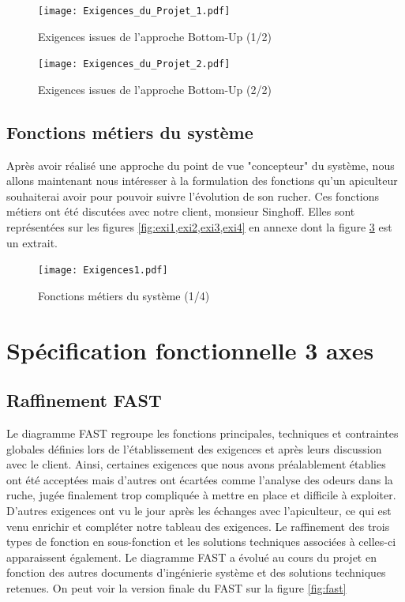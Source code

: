  
\begin{figure}[h!]
\centering\texttt{[image: Exigences\_du\_Projet\_1.pdf]}
\caption{\label{fig:exi1} Exigences issues de l'approche Bottom-Up (1/2)}
\end{figure}

 
\begin{figure}[h!]
\centering\texttt{[image: Exigences\_du\_Projet\_2.pdf]}
\caption{\label{fig:exi2} Exigences issues de l'approche Bottom-Up (2/2)}
\end{figure}

\clearpage

\section{Fonctions métiers du système}
\vspace{1.5cm}

Après avoir réalisé une approche du point de vue "concepteur" du système, nous allons maintenant nous intéresser à la formulation des fonctions qu'un apiculteur souhaiterai avoir pour pouvoir suivre l'évolution de son rucher. Ces fonctions métiers ont été discutées avec notre client, monsieur Singhoff. Elles sont représentées sur les figures \ref{fig:exi1,exi2,exi3,exi4} en annexe dont la figure \ref{fig:exi1text} est un extrait.


\begin{figure}[h!]
\centering\texttt{[image: Exigences1.pdf]}
\caption{\label{fig:exi1text} Fonctions métiers du système (1/4)}
\end{figure}


\chapter{Spécification fonctionnelle 3 axes}

\section{Raffinement FAST}
\vspace{1.5cm}
Le diagramme FAST regroupe les fonctions principales, techniques et contraintes globales définies lors de l'établissement des exigences et après leurs discussion avec le client. Ainsi, certaines exigences que nous avons préalablement établies ont été acceptées mais d'autres ont écartées comme l'analyse des odeurs dans la ruche, jugée finalement trop compliquée à mettre en place et difficile à exploiter. D'autres exigences ont vu le jour après les échanges avec l'apiculteur, ce qui est venu enrichir et compléter notre tableau des exigences. Le raffinement des trois types de fonction en sous-fonction et les solutions techniques associées à celles-ci apparaissent également. Le diagramme FAST a évolué au cours du projet en fonction des autres documents d'ingénierie système et des solutions techniques retenues. 
On peut voir la version finale du FAST sur la figure \ref{fig:fast}

